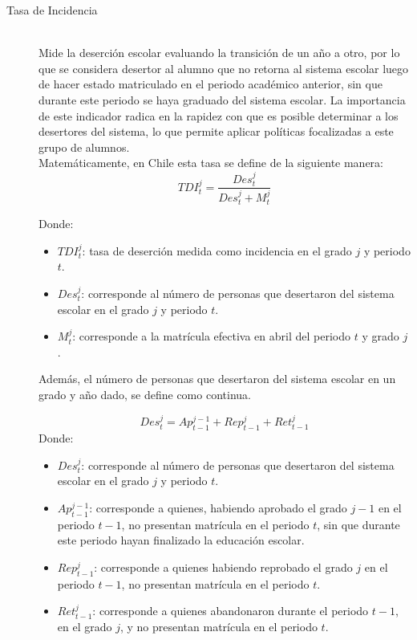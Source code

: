 \begin{description}
  \item[Tasa de Incidencia] \hfill \\
  Mide la deserción escolar evaluando la transición de un año a otro, por lo que se considera desertor al alumno que no retorna al sistema escolar luego de hacer estado matriculado en el periodo académico anterior, sin que durante este periodo se haya graduado del sistema escolar. 
  La importancia de este indicador radica en la rapidez con que es posible determinar a los desertores del sistema, lo que permite aplicar políticas focalizadas a este grupo de alumnos.\\
  Matemáticamente, en Chile esta tasa se define de la siguiente manera:\\
  
  \begin{equation}
TDI_t^j = \frac{Des_{t}^{j}}{Des_{t}^{j} + M_{t}^{j}}
    \end{equation}
    
Donde:
\begin{itemize}[label=]
    \item $TDI_t^j$: tasa de deserción medida como incidencia en el grado $j$ y periodo $t$.
    \item $Des_{t}^{j}$: corresponde al número de personas que desertaron del sistema escolar en el grado $j$ y periodo $t$.
    \item $M_{t}^{j}$: corresponde a la matrícula efectiva en abril del periodo $t$ y grado $j$.
\end{itemize}

\newpage

    Además, el número de personas que desertaron del sistema escolar en un grado y año dado, se define como continua.

  \begin{equation}
  Des_{t}^{j} = Ap_{t-1}^{j-1} + Rep_{t-1}^{j} + Ret_{t-1}^{j}
    \end{equation}
Donde:
\begin{itemize}[label=]
    \item $Des_{t}^{j}$: corresponde al número de personas que desertaron del sistema escolar en el grado $j$ y periodo $t$.
    \item $Ap_{t-1}^{j-1}$: corresponde a quienes, habiendo aprobado el grado $j-1$ en el periodo $t-1$, no presentan matrícula en el periodo $t$, sin que durante este periodo hayan finalizado la educación escolar.
    \item $Rep_{t-1}^{j}$: corresponde a quienes habiendo reprobado el grado $j$ en el periodo $t-1$, no presentan matrícula en el periodo $t$.
    \item $Ret_{t-1}^{j}$: corresponde a quienes abandonaron durante el periodo $t-1$, en el grado $j$, y no presentan matrícula en el periodo $t$.
\end{itemize}



\end{description}
